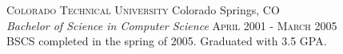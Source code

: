 
\textsc{Colorado Technical University} \hfill Colorado Springs, CO\\
\emph{Bachelor of Science in Computer Science} \hfill \textsc{April 2001} - \textsc{March 2005}\\
BSCS completed in the spring of 2005.  Graduated with 3.5 GPA.

